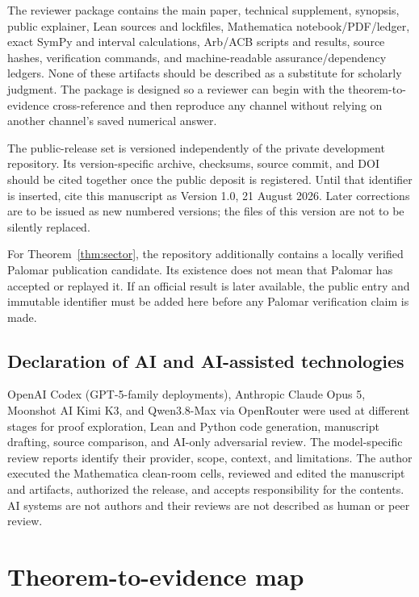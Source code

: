 \documentclass[12pt]{article}
\begin{document}
The reviewer package contains the main paper, technical supplement, synopsis,
public explainer, Lean sources and lockfiles, Mathematica notebook/PDF/ledger,
exact SymPy and interval calculations, Arb/ACB scripts and results, source
hashes, verification commands, and machine-readable assurance/dependency
ledgers.  None of these artifacts should be described as a substitute for
scholarly judgment.  The package is designed so a reviewer can begin with
the theorem-to-evidence cross-reference and then reproduce any channel
without relying on another channel's saved numerical answer.

The public-release set is versioned independently of the private development
repository.  Its version-specific archive, checksums, source commit, and DOI
should be cited together once the public deposit is registered.  Until that
identifier is inserted, cite this manuscript as Version 1.0, 21 August 2026.
Later corrections are to be issued as new numbered versions; the files of
this version are not to be silently replaced.

For Theorem~\ref{thm:sector}, the repository additionally contains a locally
verified Palomar publication candidate.  Its existence does not mean that
Palomar has accepted or replayed it.  If an official result is later
available, the public entry and immutable identifier must be added here
before any Palomar verification claim is made.

\subsection*{Declaration of AI and AI-assisted technologies}
OpenAI Codex (GPT-5-family deployments), Anthropic Claude Opus 5, Moonshot
AI Kimi K3, and Qwen3.8-Max via OpenRouter were used at different stages for
proof exploration, Lean and Python code generation, manuscript drafting,
source comparison, and AI-only adversarial review.  The model-specific review
reports identify their provider, scope, context, and limitations.  The author
executed the Mathematica clean-room cells, reviewed and edited the manuscript
and artifacts, authorized the release, and accepts responsibility for the
contents.  AI systems are not authors and their reviews are not described as
human or peer review.

\appendix
\section{Theorem-to-evidence map}\label{app:map}
\end{document}
